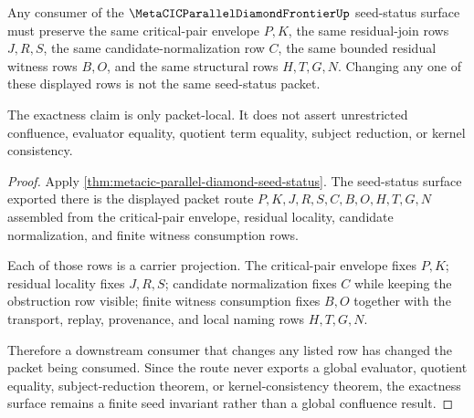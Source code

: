\begin{theorem}
\label{thm:metacic-parallel-diamond-frontier-seed-status-exactness}
Any consumer of the $\MetaCICParallelDiamondFrontierUp$ seed-status surface must preserve the same critical-pair envelope $P,K$, the same residual-join rows $J,R,S$, the same candidate-normalization row $C$, the same bounded residual witness rows $B,O$, and the same structural rows $H,T,G,N$. Changing any one of these displayed rows is not the same seed-status packet.

The exactness claim is only packet-local. It does not assert unrestricted confluence, evaluator equality, quotient term equality, subject reduction, or kernel consistency.
\end{theorem}
\begin{proof}
Apply \autoref{thm:metacic-parallel-diamond-seed-status}. The seed-status surface exported there is the displayed packet route $P,K,J,R,S,C,B,O,H,T,G,N$ assembled from the critical-pair envelope, residual locality, candidate normalization, and finite witness consumption rows.

Each of those rows is a carrier projection. The critical-pair envelope fixes $P,K$; residual locality fixes $J,R,S$; candidate normalization fixes $C$ while keeping the obstruction row visible; finite witness consumption fixes $B,O$ together with the transport, replay, provenance, and local naming rows $H,T,G,N$.

Therefore a downstream consumer that changes any listed row has changed the packet being consumed. Since the route never exports a global evaluator, quotient equality, subject-reduction theorem, or kernel-consistency theorem, the exactness surface remains a finite seed invariant rather than a global confluence result.
\end{proof}
